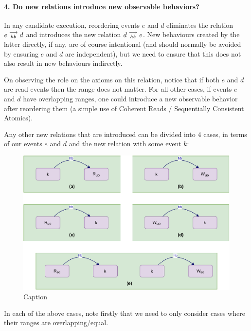 
\paragraph{4. Do new relations introduce new observable behaviors?}
        In any candidate execution, reordering events $e$ and $d$ eliminates the relation $e\stackrel{\longrightarrow}{_{hb}}d$ and introduces the new relation $d\stackrel{\longrightarrow}{_{hb}}e$. 
        New behaviours created by the latter directly, if any, are 
        of course intentional (and should normally be avoided by ensuring $e$ and $d$ are independent), but we need to ensure that this does not also result in new behaviours indirectly. 
        
        On observing the role on the axioms on this relation, notice that if both $e$ and $d$ are read events then the range does not matter. For all other cases, if events $e$ and $d$ have overlapping ranges, one could introduce a new observable behavior after reordering them (a simple use of Coherent Reads / Sequentially Consistent Atomics).     
        
        Any other new relations that are introduced can be divided into 4 cases, in terms of our events $e$ and $d$ and the new relation with some event $k$:
        \begin{figure}[H]
            \centering
            \includegraphics[scale=0.7]{Q3(a).pdf}
            \caption{Caption}
            \label{fig:my_label}
        \end{figure}
        

        In each of the above cases, note firstly that we need to only consider cases where their ranges are overlapping/equal.
        

